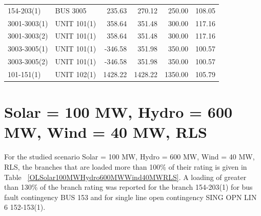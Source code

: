 \documentclass[10pt]{report}
\begin{document}
\begin{table}[H]
{\begin{tabular}{llrrrr}
154-203(1) & BUS 3005 & 235.63 & 270.12 & 250.00 & 108.05 \\
3001-3003(1) & UNIT 101(1) & 358.64 & 351.48 & 300.00 & 117.16 \\
3001-3003(2) & UNIT 101(1) & 358.64 & 351.48 & 300.00 & 117.16 \\
3003-3005(1) & UNIT 101(1) & -346.58 & 351.98 & 350.00 & 100.57 \\
3003-3005(2) & UNIT 101(1) & -346.58 & 351.98 & 350.00 & 100.57 \\
101-151(1) & UNIT 102(1) & 1428.22 & 1428.22 & 1350.00 & 105.79 \\
\bottomrule
\end{tabular}}
\end{table}

\section{Solar = 100 MW, Hydro = 600 MW, Wind = 40 MW, RLS}
For the studied scenario Solar = 100 MW, Hydro = 600 MW, Wind = 40 MW, RLS, the branches that are loaded more than 100\% of their rating is given in Table ~\ref{OLSolar100MWHydro600MWWind40MWRLS}. A loading of greater than 130\% of the branch rating was reported for the branch 154-203(1) for bus fault contingency BUS 153 and for single line open contingency SING OPN LIN   6 152-153(1).
\end{document}
